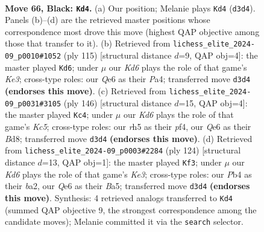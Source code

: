\documentclass[11pt]{article}
\begin{document}
\clearpage

\begin{figure}[p]\centering
\begin{subfigure}{0.46\textwidth}\centering
\resizebox{\linewidth}{!}{%
\newchessgame
\chessboard[
  setfen={8/8/4q3/7R/1p3K2/3k1B2/1b6/8 b - - 23 66},
  showmover=false,
  pgfstyle=straightmove, color=movearrow, markmove={d3-d4}
]}
\caption{}
\end{subfigure}\hfill
\begin{subfigure}{0.46\textwidth}\centering
\resizebox{\linewidth}{!}{%
\newchessgame
\chessboard[
  setfen={8/8/4k3/6R1/p3K3/4B3/P7/8 b - - 2 58},
  showmover=false,
  pgfstyle=straightmove, color=movearrow, markmove={e6-d6}
]}
\caption{}
\end{subfigure}
\\[4pt]
\begin{subfigure}{0.46\textwidth}\centering
\resizebox{\linewidth}{!}{%
\newchessgame
\chessboard[
  setfen={3B4/8/4k3/2K1b3/5p2/8/8/8 w - - 0 74},
  showmover=false,
  pgfstyle=straightmove, color=movearrow, markmove={c5-c4}
]}
\caption{}
\end{subfigure}\hfill
\begin{subfigure}{0.46\textwidth}\centering
\resizebox{\linewidth}{!}{%
\newchessgame
\chessboard[
  setfen={8/5p2/5P2/B7/8/1k2K3/b7/8 w - - 5 63},
  showmover=false,
  pgfstyle=straightmove, color=movearrow, markmove={e3-f3}
]}
\caption{}
\end{subfigure}
\caption{\textbf{Move 66, Black: \texttt{Kd4}.} (a) Our position; Melanie plays \texttt{Kd4} (\texttt{d3d4}). Panels (b)--(d) are the retrieved master positions whose correspondence most drove this move (highest QAP objective among those that transfer to it). (b) Retrieved from \texttt{lichess\_elite\_2024-09\_p0010\#1052} (ply 115) [structural distance $d$=9, QAP obj=4]: the master played \texttt{Kd6}; under $\mu$ our \emph{Kd6} plays the role of that game's \emph{Ke3}; cross-type roles: our \emph{Q}e6 as their \emph{P}a4; transferred move \texttt{d3d4} \textbf{(endorses this move)}. (c) Retrieved from \texttt{lichess\_elite\_2024-09\_p0031\#3105} (ply 146) [structural distance $d$=15, QAP obj=4]: the master played \texttt{Kc4}; under $\mu$ our \emph{Kd6} plays the role of that game's \emph{Kc5}; cross-type roles: our \emph{r}h5 as their \emph{p}f4, our \emph{Q}e6 as their \emph{B}d8; transferred move \texttt{d3d4} \textbf{(endorses this move)}. (d) Retrieved from \texttt{lichess\_elite\_2024-09\_p0003\#2284} (ply 124) [structural distance $d$=13, QAP obj=1]: the master played \texttt{Kf3}; under $\mu$ our \emph{Kd6} plays the role of that game's \emph{Ke3}; cross-type roles: our \emph{P}b4 as their \emph{b}a2, our \emph{Q}e6 as their \emph{B}a5; transferred move \texttt{d3d4} \textbf{(endorses this move)}. Synthesis: 4 retrieved analogs transferred to \texttt{Kd4} (summed QAP objective 9, the strongest correspondence among the candidate moves); Melanie committed it via the \texttt{search} selector.}
\label{fig:thought-m131}
\end{figure}
\end{document}
